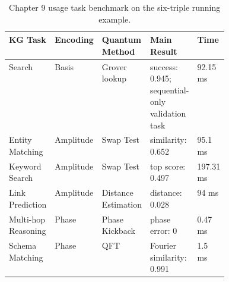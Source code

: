 \begin{table}[t]
\centering
\scriptsize
\setlength{\tabcolsep}{2pt}
\renewcommand{\arraystretch}{1.08}
\caption{Chapter 9 usage task benchmark on the six-triple running example.}
\label{tab:chapter9-usage-tasks}
\begin{tabular}{@{}p{0.085\linewidth}p{0.085\linewidth}p{0.085\linewidth}p{0.085\linewidth}p{0.085\linewidth}@{}}
\hline
KG Task & Encoding & Quantum Method & Main Result & Time \\
\hline
Search & Basis & Grover lookup & success: 0.945; sequential-only validation task & 92.15 ms \\
Entity Matching & Amplitude & Swap Test & similarity: 0.652 & 95.1 ms \\
Keyword Search & Amplitude & Swap Test & top score: 0.497 & 197.31 ms \\
Link Prediction & Amplitude & Distance Estimation & distance: 0.028 & 94 ms \\
Multi-hop Reasoning & Phase & Phase Kickback & phase error: 0 & 0.47 ms \\
Schema Matching & Phase & QFT & Fourier similarity: 0.991 & 1.5 ms \\
\hline
\end{tabular}
\end{table}
